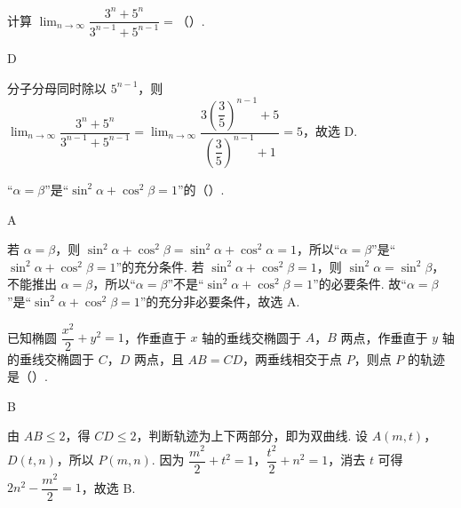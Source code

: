 \begin{problem}
计算 \(\displaystyle\lim_{n\to\infty}\dfrac{3^n+5^n}{3^{n-1}+5^{n-1}}=\)（\quad）.

\end{problem}

\begin{answer}
D
\end{answer}

\begin{solution}
分子分母同时除以 \(5^{n-1}\)，则 \(\displaystyle\lim_{n\to\infty}\dfrac{3^n+5^n}{3^{n-1}+5^{n-1}}=\lim_{n\to\infty}\dfrac{3\left(\dfrac{3}{5}\right)^{n-1}+5}{\left(\dfrac{3}{5}\right)^{n-1}+1}=5\)，故选 D.
\end{solution}

\begin{problem}
“\(\alpha=\beta\)”是“\(\sin^2\alpha+\cos^2\beta=1\)”的（\quad）.

\end{problem}

\begin{answer}
A
\end{answer}

\begin{solution}
若 \(\alpha=\beta\)，则 \(\sin^2\alpha+\cos^2\beta=\sin^2\alpha+\cos^2\alpha=1\)，所以“\(\alpha=\beta\)”是“\(\sin^2\alpha+\cos^2\beta=1\)”的充分条件. 若 \(\sin^2\alpha+\cos^2\beta=1\)，则 \(\sin^2\alpha=\sin^2\beta\)，不能推出 \(\alpha=\beta\)，所以“\(\alpha=\beta\)”不是“\(\sin^2\alpha+\cos^2\beta=1\)”的必要条件.
故“\(\alpha=\beta\)”是“\(\sin^2\alpha+\cos^2\beta=1\)”的充分非必要条件，故选 A.
\end{solution}

\begin{problem}
已知椭圆 \(\dfrac{x^2}{2}+y^2=1\)，作垂直于 \(x\) 轴的垂线交椭圆于 \(A\)，\(B\) 两点，作垂直于 \(y\) 轴的垂线交椭圆于 \(C\)，\(D\) 两点，且 \(AB=CD\)，两垂线相交于点 \(P\)，则点 \(P\) 的轨迹是（\quad）.

\end{problem}

\begin{answer}
B
\end{answer}

\begin{solution}
由 \(AB\leq2\)，得 \(CD\leq2\)，判断轨迹为上下两部分，即为双曲线. 设 \(A(m,t)\)，\(D(t,n)\)，所以 \(P(m,n)\). 因为 \(\dfrac{m^2}{2}+t^2=1\)，\(\dfrac{t^2}{2}+n^2=1\)，消去 \(t\) 可得 \(2n^2-\dfrac{m^2}{2}=1\)，故选 B.

\end{solution}

